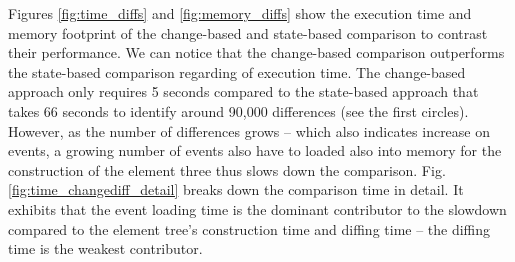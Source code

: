 \documentclass{llncs}
\begin{document}
Figures \ref{fig:time_diffs} and \ref{fig:memory_diffs} show the execution time and memory footprint of the change-based and state-based comparison to contrast their performance. We can notice that the change-based comparison outperforms the state-based comparison regarding of execution time. The change-based approach only requires 5 seconds compared to the state-based approach that takes 66 seconds to identify around 90,000 differences (see the first circles). However, as the number of differences grows -- which also indicates increase on events, a growing number of events also have to loaded also into memory for the construction of the element three thus slows down the comparison. Fig. \ref{fig:time_changediff_detail} breaks down the comparison time in detail. It exhibits that the event loading time is the dominant contributor to the slowdown compared to the element tree's construction time and diffing time -- the diffing time is the weakest contributor. 
\end{document}
